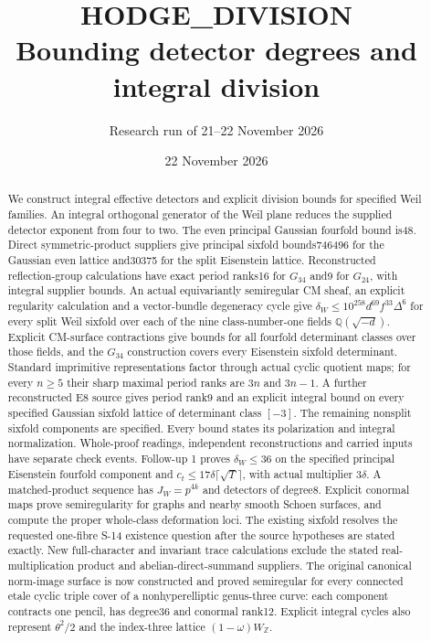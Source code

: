 \documentclass[11pt]{article}
\title{HODGE\_DIVISION\\Bounding detector degrees and integral division}
\author{Research run of 21--22 November 2026}
\date{22 November 2026}
\begin{document}
\maketitle
\begin{abstract}
We construct integral effective detectors and explicit division bounds for specified Weil families. An integral orthogonal generator of the Weil plane reduces the supplied detector exponent from four to two. The even principal Gaussian fourfold bound is48. Direct symmetric-product suppliers give principal sixfold bounds746496 for the Gaussian even lattice and30375 for the split Eisenstein lattice. Reconstructed reflection-group calculations have exact period ranks16 for $G_{34}$ and9 for $G_{24}$, with integral supplier bounds. An actual equivariantly semiregular CM sheaf, an explicit regularity calculation and a vector-bundle degeneracy cycle give
$\delta_W\le10^{258}d^{69}f^{33}\Delta^6$
for every split Weil sixfold over each of the nine class-number-one fields $\mathbb Q(\sqrt{-d})$. Explicit CM-surface contractions give bounds for all fourfold determinant classes over those fields, and the $G_{34}$ construction covers every Eisenstein sixfold determinant. Standard imprimitive representations factor through actual cyclic quotient maps; for every $n\ge5$ their sharp maximal period ranks are $3n$ and $3n-1$. A further reconstructed E8 source gives period rank9 and an explicit integral bound on every specified Gaussian sixfold lattice of determinant class $[-3]$. The remaining nonsplit sixfold components are specified. Every bound states its polarization and integral normalization. Whole-proof readings, independent reconstructions and carried inputs have separate check events.
 Follow-up 1 proves $\delta_W\le36$ on the specified principal Eisenstein fourfold component and $c_t\le17\delta\lceil\sqrt T\rceil$, with actual multiplier $3\delta$. A matched-product sequence has $J_W=p^{4k}$ and detectors of degree8. Explicit conormal maps prove semiregularity for graphs and nearby smooth Schoen surfaces, and compute the proper whole-class deformation loci. The existing sixfold resolves the requested one-fibre S-14 existence question after the source hypotheses are stated exactly. New full-character and invariant trace calculations exclude the stated real-multiplication product and abelian-direct-summand suppliers. 
 The original canonical norm-image surface is now constructed and proved semiregular for every connected etale cyclic triple cover of a nonhyperelliptic genus-three curve: each component contracts one pencil, has degree36 and conormal rank12. Explicit integral cycles also represent $\theta^2/2$ and the index-three lattice $(1-\omega)W_{\mathbb Z}$. 

\end{abstract}
\end{document}
